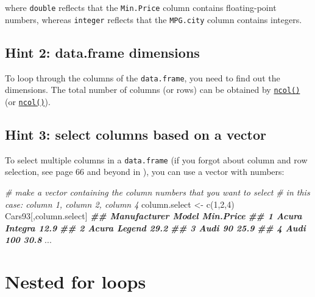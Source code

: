 \documentclass[
]{book}
\newenvironment{Shaded}{\begin{snugshade}}{\end{snugshade}}
\newcommand{\CommentTok}[1]{\textcolor[rgb]{0.56,0.35,0.01}{\textit{#1}}}
\newcommand{\DecValTok}[1]{\textcolor[rgb]{0.00,0.00,0.81}{#1}}
\newcommand{\DocumentationTok}[1]{\textcolor[rgb]{0.56,0.35,0.01}{\textbf{\textit{#1}}}}
\newcommand{\FunctionTok}[1]{\textcolor[rgb]{0.00,0.00,0.00}{#1}}
\newcommand{\NormalTok}[1]{#1}
\newcommand{\OtherTok}[1]{\textcolor[rgb]{0.56,0.35,0.01}{#1}}
\begin{document}
where \texttt{double} reflects that the \texttt{Min.Price} column contains floating-point numbers, whereas \texttt{integer} reflects that the \texttt{MPG.city} column contains integers.

\hypertarget{hint-2-data.frame-dimensions}{%
\subsection{Hint 2: data.frame dimensions}\label{hint-2-data.frame-dimensions}}

To loop through the columns of the \texttt{data.frame}, you need to find out the dimensions. The total number of columns (or rows) can be obtained by \href{https://stat.ethz.ch/R-manual/R-devel/library/base/html/nrow.html}{\texttt{ncol()}} (or \href{https://stat.ethz.ch/R-manual/R-devel/library/base/html/nrow.html}{\texttt{ncol()}}).

\hypertarget{hint-3-select-columns-based-on-a-vector}{%
\subsection{Hint 3: select columns based on a vector}\label{hint-3-select-columns-based-on-a-vector}}

To select multiple columns in a \texttt{data.frame} (if you forgot about column and row selection, see page 66 and beyond in \citep{Matloff2011}), you can use a vector with numbers:

\begin{Shaded}
\begin{Highlighting}[]
\CommentTok{\# make a vector containing the column numbers that you want to select}
\CommentTok{\# in this case: column 1, column 2, column 4}
\NormalTok{column.select }\OtherTok{\textless{}{-}} \FunctionTok{c}\NormalTok{(}\DecValTok{1}\NormalTok{,}\DecValTok{2}\NormalTok{,}\DecValTok{4}\NormalTok{)}
\NormalTok{Cars93[,column.select]}
\DocumentationTok{\#\#     Manufacturer          Model Min.Price}
\DocumentationTok{\#\# 1          Acura        Integra      12.9}
\DocumentationTok{\#\# 2          Acura         Legend      29.2}
\DocumentationTok{\#\# 3           Audi             90      25.9}
\DocumentationTok{\#\# 4           Audi            100      30.8}
\NormalTok{...}
\end{Highlighting}
\end{Shaded}

\hypertarget{nested-for-loops}{%
\section{Nested for loops}\label{nested-for-loops}}
\end{document}
